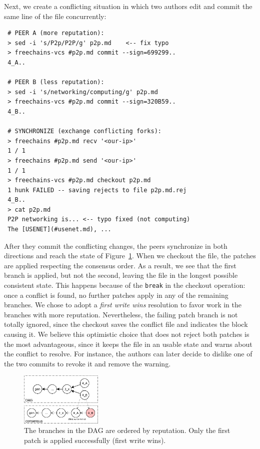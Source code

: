 \documentclass[10pt,journal,compsoc]{IEEEtran}
\newcommand{\code}[1]  {\texttt{\footnotesize{#1}}}
\begin{document}
Next, we create a conflicting situation in which two authors edit and commit
the same line of the file concurrently:

{\footnotesize
\begin{verbatim}
 # PEER A (more reputation):
 > sed -i 's/P2p/P2P/g' p2p.md    <-- fix typo
 > freechains-vcs #p2p.md commit --sign=699299..
 4_A..

 # PEER B (less reputation):
 > sed -i 's/networking/computing/g' p2p.md
 > freechains-vcs #p2p.md commit --sign=320B59..
 4_B..

 # SYNCHRONIZE (exchange conflicting forks):
 > freechains #p2p.md recv '<our-ip>'
 1 / 1
 > freechains #p2p.md send '<our-ip>'
 1 / 1
 > freechains-vcs #p2p.md checkout p2p.md
 1 hunk FAILED -- saving rejects to file p2p.md.rej
 4_B..
 > cat p2p.md
 P2P networking is... <-- typo fixed (not computing)
 The [USENET](#usenet.md), ...
\end{verbatim}
}

After they commit the conflicting changes, the peers synchronize in both
directions and reach the state of Figure~\ref{fig.conflict}.
When we checkout the file, the patches are applied respecting the consensus
order.
As a result, we see that the first branch is applied, but not the second,
leaving the file in the longest possible consistent state.
%
This happens because of the \code{break} in the checkout operation:
once a conflict is found, no further patches apply in any of the remaining
branches.
%
We chose to adopt a \emph{first write wins} resolution to favor work in the
branches with more reputation.
Nevertheless, the failing patch branch is not totally ignored, since the
checkout saves the conflict file and indicates the block causing it.
%
We believe this optimistic choice that does not reject both patches is the most
advantageous, since it keeps the file in an usable state and warns about the
conflict to resolve.
For instance, the authors can later decide to dislike one of the two commits to
revoke it and remove the warning.

\begin{figure}
\centering
\includegraphics[width=0.35\textwidth]{conflict.png}
\caption{
    The branches in the DAG are ordered by reputation.
    Only the first patch is applied successfully (first write wins).
}
\label{fig.conflict}
\end{figure}
\end{document}
